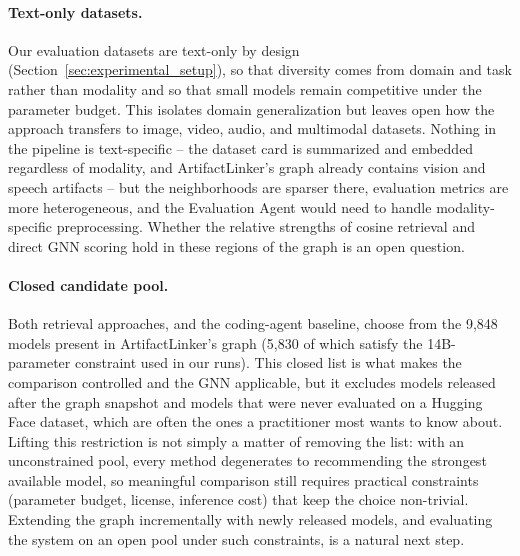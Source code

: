 \paragraph{Text-only datasets.} Our evaluation datasets are text-only by design (Section~\ref{sec:experimental_setup}), so that diversity comes from domain and task rather than modality and so that small models remain competitive under the parameter budget. This isolates domain generalization but leaves open how the approach transfers to image, video, audio, and multimodal datasets. Nothing in the pipeline is text-specific -- the dataset card is summarized and embedded regardless of modality, and ArtifactLinker's graph already contains vision and speech artifacts -- but the neighborhoods are sparser there, evaluation metrics are more heterogeneous, and the Evaluation Agent would need to handle modality-specific preprocessing. Whether the relative strengths of cosine retrieval and direct GNN scoring hold in these regions of the graph is an open question.

\paragraph{Closed candidate pool.} Both retrieval approaches, and the coding-agent baseline, choose from the 9{,}848 models present in ArtifactLinker's graph (5{,}830 of which satisfy the 14B-parameter constraint used in our runs). This closed list is what makes the comparison controlled and the GNN applicable, but it excludes models released after the graph snapshot and models that were never evaluated on a Hugging Face dataset, which are often the ones a practitioner most wants to know about. Lifting this restriction is not simply a matter of removing the list: with an unconstrained pool, every method degenerates to recommending the strongest available model, so meaningful comparison still requires practical constraints (parameter budget, license, inference cost) that keep the choice non-trivial. Extending the graph incrementally with newly released models, and evaluating the system on an open pool under such constraints, is a natural next step.


